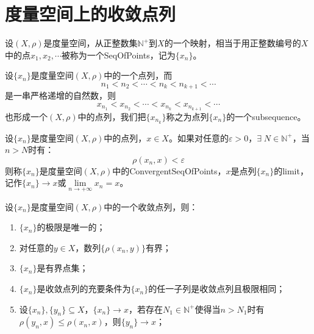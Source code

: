 \section{度量空间上的收敛点列}
\begin{definition}
	设$(X,\rho)$是度量空间，从正整数集$\mathbb{N}^+$到$X$的一个映射，相当于用正整数编号的$X$中的点$x_1,x_2,\cdots$被称为一个\gls{SeqOfPoints}，记为$\{x_n\}$。
\end{definition}
\begin{definition}
	设$\{x_n\}$是度量空间$(X,\rho)$中的一个点列，而
	\begin{equation*}
		n_1<n_2<\cdots<n_k<n_{k+1}<\cdots
	\end{equation*}
	是一串严格递增的自然数，则
	\begin{equation*}
		x_{n_1}<x_{n_2}<\cdots<x_{n_k}<x_{n_{k+1}}<\cdots
	\end{equation*}
	也形成一个$(X,\rho)$中的点列，我们把$\{x_{n_k}\}$称之为点列$\{x_n\}$的一个\gls{subsequence}。
\end{definition}
\begin{definition}
	设$\{x_n\}$是度量空间$(X,\rho)$中的点列，$x\in X$。如果对任意的$\varepsilon>0$，$\exists\; N\in\mathbb{N}^+$，当$n>N$时有：
	\begin{equation*}
		\rho(x_n,x)<\varepsilon
	\end{equation*}
	则称$\{x_n\}$是度量空间$(X,\rho)$中的\gls{ConvergentSeqOfPoints}，$x$是点列$\{x_n\}$的\gls{limit}，记作$\{x_n\}\to x$或$\lim\limits_{n\to+\infty}x_n=x$。
\end{definition}
\begin{property}\label{prop:ConvergentSeqOfPoints}
	设$\{x_n\}$是度量空间$(X,\rho)$中的一个收敛点列，则：
	\begin{enumerate}
		\item $\{x_n\}$的极限是唯一的；
		\item 对任意的$ y\in X$，数列$\{\rho(x_n,y)\}$有界；
		\item $\{x_n\}$是有界点集；
		\item $\{x_n\}$是收敛点列的充要条件为$\{x_n\}$的任一子列是收敛点列且极限相同；
		\item 设$\{x_n\},\{y_n\}\subseteq X$，$\{x_n\}\to x$，若存在$N_1\in\mathbb{N}^+$使得当$n>N_1$时有$\rho(y_n,x)\leqslant\rho(x_n,x)$，则$\{y_n\}\to x$；
	\end{enumerate}
\end{property}
